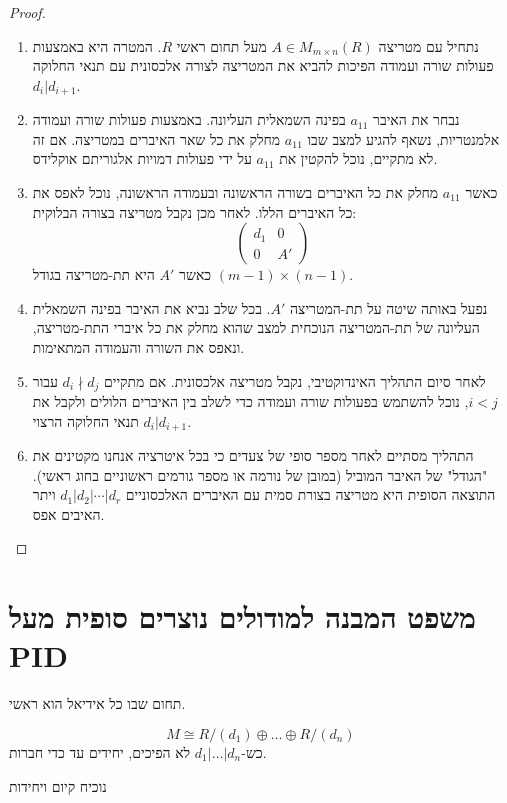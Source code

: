 \documentclass{tstextbook}
\begin{document}
\begin{proof}
  \begin{enumerate}
    \item נתחיל עם מטריצה \(A \in M_{m \times n}(R)\) מעל תחום ראשי \(R\). המטרה היא באמצעות פעולות שורה ועמודה הפיכות להביא את המטריצה לצורה אלכסונית עם תנאי החלוקה \(d_i | d_{i+1}\).  


    \item נבחר את האיבר \(a_{11}\) בפינה השמאלית העליונה. באמצעות פעולות שורה ועמודה אלמנטריות, נשאף להגיע למצב שבו \(a_{11}\) מחלק את כל שאר האיברים במטריצה. אם זה לא מתקיים, נוכל להקטין את \(a_{11}\) על ידי פעולות דמויות אלגוריתם אוקלידס. 


    \item כאשר \(a_{11}\) מחלק את כל האיברים בשורה הראשונה ובעמודה הראשונה, נוכל לאפס את כל האיברים הללו. לאחר מכן נקבל מטריצה בצורה הבלוקית: 
$$\begin{pmatrix}d_1 & 0 \\0 & A'\end{pmatrix}
$$
כאשר \(A'\) היא תת-מטריצה בגודל \((m-1)\times(n-1)\).


    \item נפעל באותה שיטה על תת-המטריצה \(A'\). בכל שלב נביא את האיבר בפינה השמאלית העליונה של תת-המטריצה הנוכחית למצב שהוא מחלק את כל איברי התת-מטריצה, ונאפס את השורה והעמודה המתאימות. 


    \item לאחר סיום התהליך האינדוקטיבי, נקבל מטריצה אלכסונית. אם מתקיים \(d_i \nmid d_j\) עבור \(i < j\), נוכל להשתמש בפעולות שורה ועמודה כדי לשלב בין האיברים הלולים ולקבל את תנאי החלוקה הרצוי \(d_i | d_{i+1}\). 


    \item התהליך מסתיים לאחר מספר סופי של צעדים כי בכל איטרציה אנחנו מקטינים את "הגודל" של האיבר המוביל (במובן של נורמה או מספר גורמים ראשוניים בחוג ראשי). התוצאה הסופית היא מטריצה בצורת סמית עם האיברים האלכסוניים \(d_1 | d_2 | \cdots | d_r\) ויתר האיבים אפס. 


  \end{enumerate}
\end{proof}
\section{משפט המבנה למודולים נוצרים סופית מעל PID}

\begin{reminder}
תחום שבו כל אידיאל הוא ראשי.

\end{reminder}
\begin{theorem}
$$M\cong  R / (d_{1}) \oplus \dots \oplus R / (d_{n})$$
כש-\(d_{1}|\dots|d_{n}\) לא הפיכים, יחידים עד כדי חברות.

\end{theorem}
נוכיח קיום ויחידות
\end{document}
